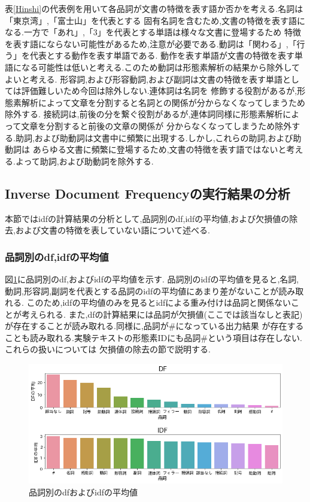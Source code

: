 \documentclass[a4j]{jarticle}
\begin{document}
	表\ref{Hinshi}の代表例を用いて各品詞が文書の特徴を表す語か否かを考える.名詞は「東京湾」,「富士山」を代表とする
	固有名詞を含むため,文書の特徴を表す語になる.一方で「あれ」,「3」を代表とする単語は様々な文書に登場するため
	特徴を表す語にならない可能性があるため,注意が必要である.動詞は「関わる」,「行う」を代表とする動作を表す単語である.
	動作を表す単語が文書の特徴を表す単語になる可能性は低いと考える.このため動詞は形態素解析の結果から除外してよいと考える.
	形容詞,および形容動詞,および副詞は文書の特徴を表す単語としては評価難しいため今回は除外しない.連体詞は名詞を
	修飾する役割があるが,形態素解析によって文章を分割すると名詞との関係が分からなくなってしまうため除外する.
	接続詞は,前後の分を繋ぐ役割があるが,連体詞同様に形態素解析によって文章を分割すると前後の文章の関係が
	分からなくなってしまうため除外する.助詞,および助動詞は文書中に頻繁に出現する.しかし,これらの助詞,および助動詞は
	あらゆる文書に頻繁に登場するため,文書の特徴を表す語ではないと考える.よって助詞,および助動詞を除外する.

\subsection{Inverse Document Frequencyの実行結果の分析}
本節ではidfの計算結果の分析として,品詞別のdf,idfの平均値,および欠損値の除去,および文書の特徴を表していない語について述べる.
\subsubsection{品詞別のdf,idfの平均値}
図\ref{idfeachH}に品詞別のdf,およびidfの平均値を示す.
品詞別のidfの平均値を見ると,名詞,動詞,形容詞,副詞を代表とする品詞のidfの平均値にあまり差がないことが読み取れる.
このため,idfの平均値のみを見るとidfによる重み付けは品詞と関係ないことが考えられる.
また,dfの計算結果には品詞が欠損値(ここでは該当なしと表記)が存在することが読み取れる.同様に,品詞が\#になっている出力結果
が存在することも読み取れる.実験テキストの形態素IDにも品詞\#という項目は存在しない.これらの扱いについては
欠損値の除去の節で説明する.
\begin{figure}[H]
	\centering
	\includegraphics[scale=0.5]{idfeachH.png}
	\caption{品詞別のdfおよびidfの平均値}
   \label{idfeachH}
  \end{figure}
\end{document}
